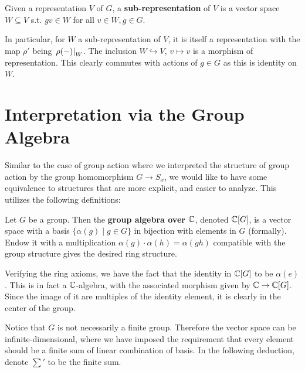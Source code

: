 \begin{definition}
    Given a representation $V$ of $G$, a \textbf{sub-representation} of $V$ is a vector space $W \subseteq V$ s.t. $gv \in W$ for all $v \in W, g \in G$. 
\end{definition}

\begin{remark}
    In particular, for $W$ a sub-representation of $V$, it is itself a representation with the map $\rho'$ being $\left.\rho(-)\right|_{W}$. The inclusion $W \hookrightarrow V$, $v \mapsto v$ is a morphism of representation. This clearly commutes with actions of $g \in G$ as this is identity on $W$.
\end{remark}

\section{Interpretation via the Group Algebra}

\textstart
Similar to the case of group action where we interpreted the structure of group action by the group homomorphism $G \to S_x$, we would like to have some equivalence to structures that are more explicit, and easier to analyze. This utilizes the following definitions:

\begin{definition}
    Let $G$ be a group. Then the \textbf{group algebra over $\mathbb{C}$}, denoted $\mathbb{C}[G]$, is a vector space with a basis $\{ \alpha(g) \mid g \in G \}$ in bijection with elements in $G$ (formally). Endow it with a multiplication $\alpha(g) \cdot \alpha(h) = \alpha(gh)$ compatible with the group structure gives the desired ring structure.
\end{definition}

\begin{remark}
    Verifying the ring axioms, we have the fact that the identity in $\mathbb{C}[G]$ to be $\alpha(e)$. This is in fact a $\mathbb{C}$-algebra, with the associated morphism given by $\mathbb{C} \to \mathbb{C}[G]$. Since the image of it are multiples of the identity element, it is clearly in the center of the group. 
\end{remark}

\textstart
Notice that $G$ is not necessarily a finite group. Therefore the vector space can be infinite-dimensional, where we have imposed the requirement that every element should be a finite sum of linear combination of basis. In the following deduction, denote $\sum'$ to be the finite sum. 


